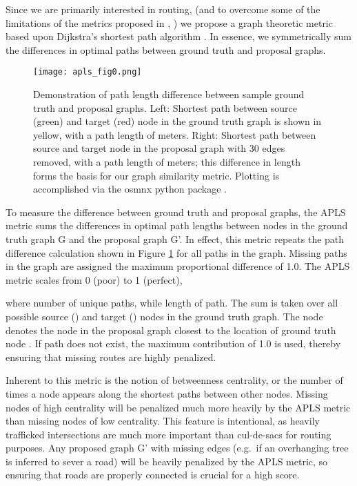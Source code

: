 \documentclass{article}
\begin{document}
Since we are primarily interested in routing, (and to overcome some of the limitations of the metrics proposed in  \cite{topo_metric},  \cite{5perc_metric}) we propose a graph theoretic metric based upon Dijkstra's shortest path algorithm \cite{Dijkstra1959}. In essence, we symmetrically sum the differences in optimal paths between ground truth and proposal graphs. 


\begin{figure}
  \centering
     \texttt{[image: apls\_fig0.png]}
  \caption{Demonstration of path length difference between sample ground truth and proposal graphs. Left: Shortest path between source (green) and target (red) node in the ground truth graph is shown in yellow, with a path length of  meters. Right: Shortest path between source and target node in the proposal graph with 30 edges removed, with a path length of  meters; this difference in length forms the basis for our graph similarity metric. Plotting is accomplished via the osmnx python package \cite{osmnx}.}
  \label{fig:apls_fig0}
\end{figure}


To measure the difference between ground truth and proposal graphs,
the APLS metric sums the differences in optimal path lengths between nodes in the ground truth graph G and the proposal graph G'. In effect, this metric repeats the path difference calculation shown in Figure \ref{fig:apls_fig0} for all paths in the graph. Missing paths in the graph are assigned the maximum proportional difference of 1.0. The APLS metric scales from 0 (poor) to 1 (perfect),


where  number of unique paths, while  length of path.  The sum is taken over all possible source () and target () nodes in the ground truth graph.  The node  denotes the node in the proposal graph closest to the location of ground truth node .  If path does not exist, the maximum contribution of 1.0 is used, thereby ensuring that missing routes are highly penalized. 



Inherent to this metric is the notion of betweenness centrality, or the number of times a node appears along the shortest paths between other nodes. Missing nodes of high centrality will be penalized much more heavily by the APLS metric than missing nodes of low centrality. This feature is intentional, as heavily trafficked intersections are much more important than cul-de-sacs for routing purposes. Any proposed graph G' with missing edges (e.g.~if an overhanging tree is inferred to sever a road) will be heavily penalized by the APLS metric, so ensuring that roads are properly connected is crucial for a high score. 
\end{document}
